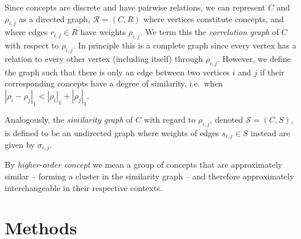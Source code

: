 \documentclass{sig-alternate}
\newcommand{\comment}[1]{{\small \color{red} {#1}} \normalcolor}
\newcommand{\rn}[1]{\rho_{#1}}
\newcommand{\rns}[1]{|\rn{#1}|_1}
\newcommand{\sy}[1]{\sigma_{#1}}
\newcommand{\dnm}[2]{|\rn{#1}-\rn{#2}|_1}
\begin{document}
Since concepts are discrete and have pairwise relations, we can represent $C$ and $\rn{i,j}$ as a directed graph,
$\mathcal{R} = (C, R)$ where vertices constitute concepts, and where edges $r_{i,j} \in R$ have weights $\rn{i,j}$. We
term this the \emph{correlation graph} of $C$ with respect to $\rn{i,j}$. In principle this is a complete graph since
every vertex has a relation to every other vertex (including itself) through $\rn{i,j}$. However, we define the graph
such that there is only an edge between two vertices $i$ and $j$ if their corresponding concepts have a degree of
similarity, i.e.\ when $\dnm{i}{j} < \rns{i} + \rns{j}$.

Analogously, the \emph{similarity graph} of $C$ with regard to $\rn{i,j}$, denoted $\mathcal{S} = (C, S)$, is defined
to be an undirected graph where weights of edges $s_{i,j} \in S$ instead are given by $\sy{i,j}$. %

By \emph{higher-order concept} we mean a group of concepts that are approximately similar -- forming a cluster in the similarity graph -- and therefore approximately interchangeable in their respective contexts.

\section{Methods}
\label{sec:methods}
\end{document}
